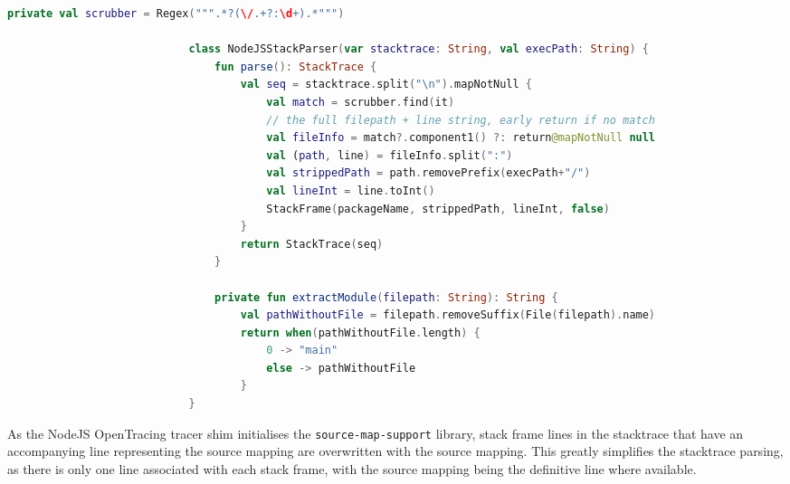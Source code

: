 \documentclass[12pt,pdftex,titlepage]{report}
\begin{document}
                    \begin{spacing}{1.0}
                        \begin{lstlisting}[language=Kotlin, gobble=28, label={lst:nodeparser}, caption={The NodeJS Stack parser class }]
                            private val scrubber = Regex(""".*?(\/.+?:\d+).*""")

                            class NodeJSStackParser(var stacktrace: String, val execPath: String) {
                                fun parse(): StackTrace {
                                    val seq = stacktrace.split("\n").mapNotNull {
                                        val match = scrubber.find(it)
                                        // the full filepath + line string, early return if no match
                                        val fileInfo = match?.component1() ?: return@mapNotNull null
                                        val (path, line) = fileInfo.split(":")
                                        val strippedPath = path.removePrefix(execPath+"/")
                                        val lineInt = line.toInt()
                                        StackFrame(packageName, strippedPath, lineInt, false)
                                    }
                                    return StackTrace(seq)
                                }
                                
                                private fun extractModule(filepath: String): String {
                                    val pathWithoutFile = filepath.removeSuffix(File(filepath).name)
                                    return when(pathWithoutFile.length) {
                                        0 -> "main"
                                        else -> pathWithoutFile
                                    }
                            }
                        \end{lstlisting}
                    \end{spacing}

                    As the NodeJS OpenTracing tracer shim initialises the \texttt{source-map-support} library, stack frame lines in the stacktrace that have an 
                    accompanying line representing the source mapping are overwritten with the source mapping. This greatly simplifies the stacktrace parsing, as there is only one line
                    associated with each stack frame, with the source mapping being the definitive line where available.
\end{document}
